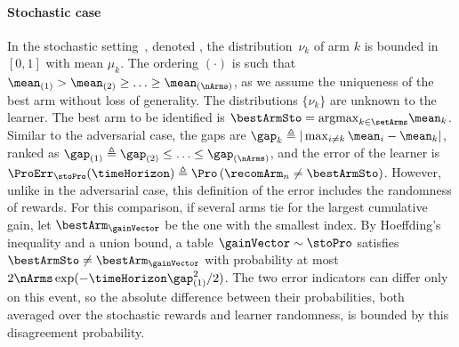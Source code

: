 \paragraph{Stochastic case}
 In the stochastic setting~\citep{Audibert10BA}, denoted
  \stoPro{}, the distribution~$\nu_{k}$ of arm $k$ is bounded in $[0,1]$ with mean $\mu_{k}$. %
 The ordering $(\cdot)$ is such that $\mean_{(1)}>\mean_{(2)}
 \geq\ldots\geq\mean_{(\nArms)}$, as we assume  the uniqueness of the best arm without loss 
 of generality.
 The distributions $\{\nu_{k}\}$ are unknown to the learner.
 The best arm to be identified is  $\bestArmSto= \argmax_{k\in\setArms} \mean_k$.
 Similar to the adversarial case, the gaps are 
 $\gap_{k} \triangleq |\max_{i \neq k} \mean_{i} - \mean_{k}|$, ranked as
$\gap_{(1)} \triangleq \gap_{(2)}\leq\ldots\leq\gap_{(\nArms)}$, 
 and the error 
 of the learner is $\ProErr_{\stoPro}(\timeHorizon) 
 \triangleq \Pro\left(\recomArm_n \neq \bestArmSto\right)$.  
 However, unlike in the adversarial case, this definition of the 
 error includes the randomness of rewards.
 For this comparison, if several arms tie for the largest cumulative gain,
 let $\bestArm_{\gainVector}$ be the one with the smallest index.
 By Hoeffding's inequality and a union bound, a table
 $\gainVector\sim\stoPro$ satisfies $\bestArmSto\neq\bestArm_\gainVector$
 with probability at most $2\nArms\exp(-\timeHorizon\gap^2_{(1)}/2)$.
 The two error indicators can differ only on this event, so the absolute
 difference between their probabilities, both averaged over the
 stochastic rewards and learner randomness, is bounded by this
 disagreement probability.
 
